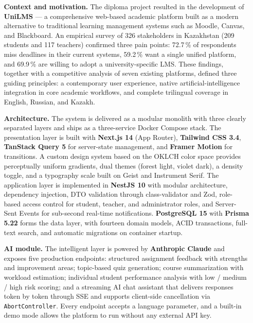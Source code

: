 \documentclass[12pt,a4paper]{article}
\begin{document}
\textbf{Context and motivation.} The diploma project resulted in the
development of \textbf{UniLMS} --- a comprehensive web-based academic platform
built as a modern alternative to traditional learning management systems such
as Moodle, Canvas, and Blackboard. An empirical survey of 326 stakeholders in
Kazakhstan (209 students and 117 teachers) confirmed three pain points:
72.7\,\% of respondents miss deadlines in their current systems, 59.2\,\% want
a single unified platform, and 69.9\,\% are willing to adopt a
university-specific LMS. These findings, together with a competitive analysis
of seven existing platforms, defined three guiding principles: a contemporary
user experience, native artificial-intelligence integration in core academic
workflows, and complete trilingual coverage in English, Russian, and Kazakh.

\textbf{Architecture.} The system is delivered as a modular monolith with
three clearly separated layers and ships as a three-service Docker Compose
stack. The presentation layer is built with \textbf{Next.js 14} (App Router),
\textbf{Tailwind CSS 3.4}, \textbf{TanStack Query 5} for server-state
management, and \textbf{Framer Motion} for transitions. A custom design system
based on the OKLCH color space provides perceptually uniform gradients, dual
themes (forest light, violet dark), a density toggle, and a typography scale
built on Geist and Instrument Serif. The application layer is implemented in
\textbf{NestJS 10} with modular architecture, dependency injection, DTO
validation through class-validator and Zod, role-based access control for
student, teacher, and administrator roles, and Server-Sent Events for
sub-second real-time notifications. \textbf{PostgreSQL 15} with \textbf{Prisma
5.22} forms the data layer, with fourteen domain models, ACID transactions,
full-text search, and automatic migrations on container startup.

\textbf{AI module.} The intelligent layer is powered by \textbf{Anthropic
Claude} and exposes five production endpoints: structured assignment feedback
with strengths and improvement areas; topic-based quiz generation; course
summarization with workload estimation; individual student performance
analysis with low / medium / high risk scoring; and a streaming AI chat
assistant that delivers responses token by token through SSE and supports
client-side cancellation via \texttt{AbortController}. Every endpoint accepts
a language parameter, and a built-in demo mode allows the platform to run
without any external API key.
\end{document}
